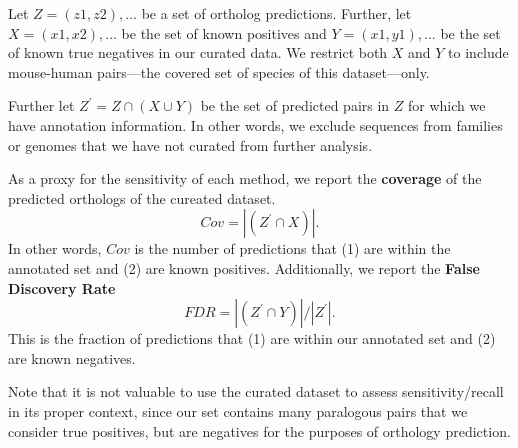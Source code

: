 \documentclass[a4paper,11pt]{article}
\begin{document}
Let $Z = {(z1 , z2 ),\ldots}$ be a set of ortholog predictions. Further, let $X = {(x1 , x2 ), \ldots}$ be the set of known positives and $Y = {(x1 , y1 ), \ldots}$ be the set of known true negatives in our curated data. We restrict both $X$ and $Y$ to include mouse-human pairs---the covered set of species of this dataset---only.

Further let
$Z^{'} = Z \cap (X \cup Y )$
be the set of predicted pairs in $Z$ for which we have annotation information. In other words, we exclude
sequences from families or genomes that we have not curated from further analysis.

As a proxy for the sensitivity of each method, we report the \textbf{coverage} of the predicted orthologs of the cureated dataset.
$$Cov = |(Z^{'} \cap X )|.$$
In other words, $Cov$ is the number of predictions that (1) are within the annotated set and (2) are known positives. Additionally, we report the \textbf{False Discovery Rate} 
$$FDR = |(Z^{'} \cap Y )| / |Z^{'}|.$$
This is the fraction of predictions that (1) are within our annotated set and (2) are known negatives.

Note that it is not valuable to use the curated dataset to assess sensitivity/recall in its proper context, since our set contains many paralogous pairs that we consider true positives, but are negatives for the purposes of orthology prediction.
\end{document}
